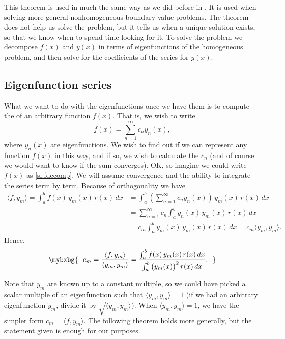 This theorem is used in much the same way as we did before in
.  It is used when solving more general nonhomogeneous
boundary value problems.  The theorem does not help us solve the problem, but
it tells us when a unique solution exists, so
that we know when to spend time looking for it.  To solve the problem
we decompose $f(x)$ and $y(x)$ in terms of eigenfunctions of the
homogeneous
problem, and then solve for the coefficients of the series for $y(x)$.

\subsection{Eigenfunction series}

What we want to do with the eigenfunctions once we have them is to
compute the \emph{} of an arbitrary
function $f(x)$.  That is, we wish to write
\begin{equation} \label{sl:fdecomp}
f(x) = \sum_{n=1}^\infty c_n y_n(x) ,
\end{equation}
where $y_n(x)$ are eigenfunctions.
We wish to find out if we can represent
any function $f(x)$ in this way,
and if so, we wish to calculate the $c_n$ (and of course we would want to know if
the sum converges).  OK\@, so imagine
we could write $f(x)$ as \eqref{sl:fdecomp}.  We will assume convergence and
the ability to integrate the series term by term.
Because of orthogonality we have
\begin{equation*}
\begin{split}
\langle f , y_m \rangle
 = \int_a^b f(x) \, y_m (x) \, r(x) \, dx
& = \int_a^b \left( \sum_{n=1}^\infty c_n y_n(x) \right) \, y_m (x) \, r(x)
\, dx\\
&= \sum_{n=1}^\infty c_n \int_a^b y_n(x) \, y_m (x) \, r(x) \, dx\\
&= c_m \int_a^b y_m(x) \, y_m (x) \, r(x) \, dx = c_m \langle y_m , y_m \rangle
.
\end{split}
\end{equation*}
Hence,
\begin{equation} \label{sl:cm}
\mybxbg{~~
c_m = \frac{\langle f , y_m \rangle}{\langle y_m , y_m \rangle}
=
\frac{\int_a^b f(x) \, y_m (x)\, r(x) \, dx}%
{\int_a^b {\bigl(y_m(x)\bigr)}^2 \, r(x) \,dx} .
~~}
\end{equation}

Note that $y_m$ are known up to a constant multiple, so we could have picked
a scalar multiple of an eigenfunction such that
$\langle y_m , y_m \rangle = 1$ (if we had an arbitrary eigenfunction
$\tilde{y}_m$, divide it
by $\sqrt{\langle \tilde{y}_m , \tilde{y}_m \rangle}$).
When
$\langle y_m , y_m \rangle = 1$,
we have the
simpler form $c_m = \langle f, y_m \rangle$.
The following theorem holds
more generally, but the statement given is enough for our purposes.

